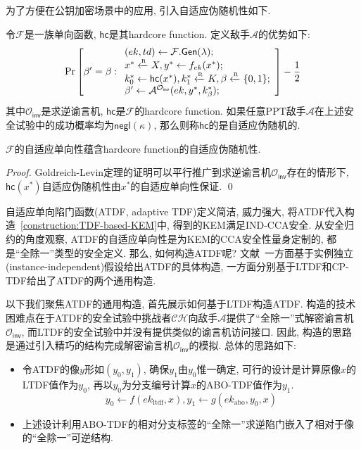 为了方便在公钥加密场景中的应用, 引入自适应伪随机性如下.  
\begin{definition}[自适应伪随机性]
令$\mathcal{F}$是一族单向函数, $\mathsf{hc}$是其hardcore function. 定义敌手$\mathcal{A}$的优势如下:  
\begin{displaymath} 
\Pr \left[
\beta' = \beta: 
\begin{array}{l}
    (ek, td) \leftarrow \mathcal{F}.\mathsf{Gen}(\lambda);\\
    x^* \xleftarrow{\textup{\tiny R}} X, y^* \leftarrow f_{ek}(x^*);\\
    k_0^* \leftarrow \mathsf{hc}(x^*), k_1^* \xleftarrow{\textup{\tiny R}} K, \beta \xleftarrow{\textup{\tiny R}} \{0,1\};\\
    \beta' \leftarrow \mathcal{A}^{\mathcal{O}_\mathsf{inv}}(ek, y^*, k_\beta^*);
\end{array} 
\right] - \frac{1}{2}
\end{displaymath}
其中$\mathcal{O}_\mathsf{inv}$是求逆谕言机, $\mathsf{hc}$是$\mathcal{F}$的hardcore function. 
如果任意PPT敌手$\mathcal{A}$在上述安全试验中的成功概率均为$\mathsf{negl}(\kappa)$, 
那么则称$\mathsf{hc}$的是自适应伪随机的.  
\end{definition}

\begin{corollary}
$\mathcal{F}$的自适应单向性蕴含hardcore function的自适应伪随机性.
\end{corollary}
\begin{proof}
Goldreich-Levin定理的证明可以平行推广到求逆谕言机$\mathcal{O}_\mathsf{inv}$存在的情形下, 
$\mathsf{hc}(x^*)$自适应伪随机性由$x^*$的自适应单向性保证. \qed
\end{proof}

自适应单向陷门函数(ATDF, adaptive TDF)定义简洁, 威力强大, 将ATDF代入构造~\ref{construction:TDF-based-KEM}中, 
得到的KEM满足IND-CCA安全. 从安全归约的角度观察, ATDF的自适应单向性是为KEM的CCA安全性量身定制的, 都是``全除一''类型的安全定义. 
那么, 如何构造ATDF呢? 文献~\cite{KMO-EUROCRYPT-2010}一方面基于实例独立(instance-independent)假设给出ATDF的具体构造, 
一方面分别基于LTDF和CP-TDF给出了ATDF的两个通用构造. 

以下我们聚焦ATDF的通用构造, 首先展示如何基于LTDF构造ATDF. 
构造的技术困难点在于ATDF的安全试验中挑战者$\mathcal{CH}$向敌手$\mathcal{A}$提供了``全除一''式解密谕言机$\mathcal{O}_\mathsf{inv}$, 
而LTDF的安全试验中并没有提供类似的谕言机访问接口. 
因此, 构造的思路是通过引入精巧的结构完成解密谕言机$\mathcal{O}_\mathsf{inv}$的模拟. 
总体的思路如下: 
\begin{itemize} 
\item 令ATDF的像$y$形如$(y_0, y_1)$, 确保$y_1$由$y_0$惟一确定, 可行的设计是计算原像$x$的LTDF值作为$y_0$, 
	再以$y_0$为分支编号计算$x$的ABO-TDF值作为$y_1$. 
\begin{equation*}
    y_0 \leftarrow f(ek_\text{ltdf}, x), y_1 \leftarrow g(ek_\text{abo}, y_0, x) 
\end{equation*}

\item 上述设计利用ABO-TDF的相对分支标签的``全除一''求逆陷门嵌入了相对于像的``全除一''可逆结构. 
\end{itemize}

